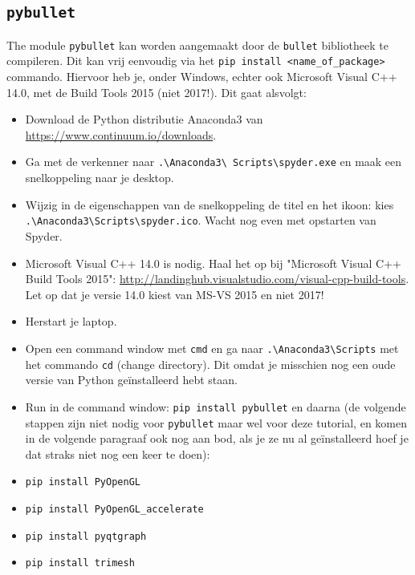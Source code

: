 \documentclass[a4paper,11pt]{article}
\begin{document}
\subsection{\texttt{pybullet}}
The module \texttt{pybullet} kan worden aangemaakt door de \texttt{bullet}
bibliotheek te compileren. Dit kan vrij eenvoudig via het \texttt{pip install
<name\_of\_package>} commando. Hiervoor heb je, onder Windows, echter ook
Microsoft Visual C++ 14.0, met de Build Tools 2015 (niet 2017!). Dit gaat
alsvolgt:
\begin{itemize}
\item Download de Python distributie Anaconda3 van \url{https://www.continuum.io/downloads}.

\item Ga met de verkenner naar \texttt{.\backslash Anaconda3\backslash
  Scripts\backslash spyder.exe} en maak een snelkoppeling naar je desktop.

\item Wijzig in de eigenschappen van de snelkoppeling de titel en het ikoon:
  kies \texttt{.\backslash Anaconda3\backslash Scripts\backslash spyder.ico}. Wacht nog even met opstarten van Spyder.

\item Microsoft Visual C++ 14.0 is nodig. Haal het op bij "Microsoft Visual C++ Build Tools 2015": 
\url{http://landinghub.visualstudio.com/visual-cpp-build-tools}. Let op dat je versie 14.0 kiest van MS-VS 2015 en niet 2017!

\item Herstart je laptop.

\item Open een command window met \texttt{cmd} en ga naar \texttt{.\backslash Anaconda3\backslash Scripts} met het commando \texttt{cd} (change directory). Dit omdat je misschien nog een oude versie van Python geïnstalleerd hebt staan.

\item Run in de command window: \texttt{pip install pybullet} en daarna (de volgende stappen zijn niet nodig voor \texttt{pybullet} maar wel voor deze tutorial, en komen in de volgende paragraaf ook nog aan bod, als je ze nu al ge\"installeerd hoef je dat straks niet nog een keer te doen):

\item \texttt{pip install PyOpenGL}

\item \texttt{pip install PyOpenGL\_accelerate}

\item \texttt{pip install pyqtgraph}

\item \texttt{pip install trimesh}

\end{itemize}
\end{document}
